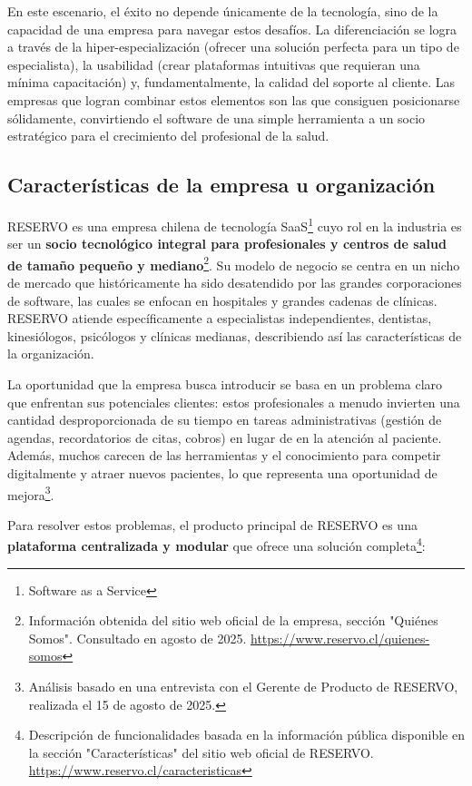 En este escenario, el éxito no depende únicamente de la tecnología, sino de la capacidad de una empresa para navegar estos desafíos. La diferenciación se logra a través de la hiper-especialización (ofrecer una solución perfecta para un tipo de especialista), la usabilidad (crear plataformas intuitivas que requieran una mínima capacitación) y, fundamentalmente, la calidad del soporte al cliente. Las empresas que logran combinar estos elementos son las que consiguen posicionarse sólidamente, convirtiendo el software de una simple herramienta a un socio estratégico para el crecimiento del profesional de la salud.

\subsection{Características de la empresa u organización}

RESERVO es una empresa chilena de tecnología SaaS\footnote{Software as a Service} cuyo rol en la industria es ser un \textbf{socio tecnológico integral para profesionales y centros de salud de tamaño pequeño y mediano}\footnote{Información obtenida del sitio web oficial de la empresa, sección "Quiénes Somos". Consultado en agosto de 2025. \url{https://www.reservo.cl/quienes-somos}}. Su modelo de negocio se centra en un nicho de mercado que históricamente ha sido desatendido por las grandes corporaciones de software, las cuales se enfocan en hospitales y grandes cadenas de clínicas. RESERVO atiende específicamente a especialistas independientes, dentistas, kinesiólogos, psicólogos y clínicas medianas, describiendo así las características de la organización.

La oportunidad que la empresa busca introducir se basa en un problema claro que enfrentan sus potenciales clientes: estos profesionales a menudo invierten una cantidad desproporcionada de su tiempo en tareas administrativas (gestión de agendas, recordatorios de citas, cobros) en lugar de en la atención al paciente. Además, muchos carecen de las herramientas y el conocimiento para competir digitalmente y atraer nuevos pacientes, lo que representa una oportunidad de mejora\footnote{Análisis basado en una entrevista con el Gerente de Producto de RESERVO, realizada el 15 de agosto de 2025.}.

Para resolver estos problemas, el producto principal de RESERVO es una \textbf{plataforma centralizada y modular} que ofrece una solución completa\footnote{Descripción de funcionalidades basada en la información pública disponible en la sección "Características" del sitio web oficial de RESERVO. \url{https://www.reservo.cl/caracteristicas}}:


